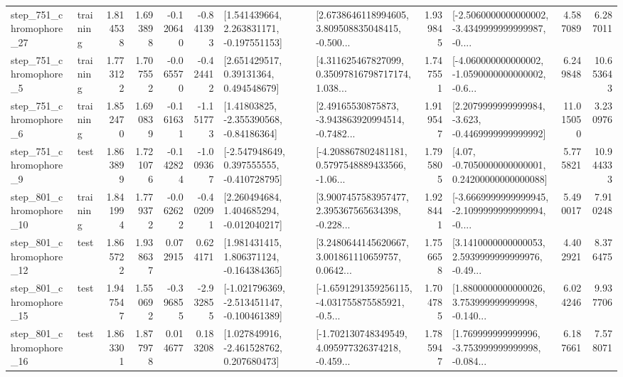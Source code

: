 \begin{tabular}{llrrrrllrlrr}
  step\_751\_chromophore\_27 &  training &      1.814538 &    1.693898 &     -0.120640 & -0.841393 &    [1.541439664, 2.263831171, -0.197551153] &  [2.6738646118994605, 3.809508835048415, -0.500... &       1.939845 &  [-2.5060000000000002, -3.4349999999999987, -0.... &            4.587089 &          6.287011 \\
   step\_751\_chromophore\_5 &  training &      1.773122 &    1.707552 &     -0.065570 & -0.424412 &      [2.651429517, 0.39131364, 0.494548679] &  [4.311625467827099, 0.35097816798717174, 1.038... &       1.747551 &  [-4.060000000000002, -1.0590000000000002, -0.6... &            6.249848 &         10.653643 \\
   step\_751\_chromophore\_6 &  training &      1.852470 &    1.690839 &     -0.161631 & -1.151773 &     [1.41803825, -2.355390568, -0.84186364] &  [2.49165530875873, -3.943863920994514, -0.7482... &       1.919547 &  [2.2079999999999984, -3.623, -0.4469999999999992] &           11.015050 &          3.230976 \\
   step\_751\_chromophore\_9 &      test &      1.863899 &    1.721076 &     -0.142824 & -1.009367 &   [-2.547948649, 0.397555555, -0.410728795] &  [-4.208867802481181, 0.5797548889433566, -1.06... &       1.795805 &   [4.07, -0.7050000000000001, 0.24200000000000088] &            5.775821 &         10.944333 \\
  step\_801\_chromophore\_10 &  training &      1.841994 &    1.779372 &     -0.062622 & -0.402091 &    [2.260494684, 1.404685294, -0.012040217] &  [3.9007457583957477, 2.395367565634398, -0.228... &       1.928441 &  [-3.6669999999999945, -2.1099999999999994, -0.... &            5.490017 &          7.910248 \\
  step\_801\_chromophore\_12 &      test &      1.865722 &    1.938637 &      0.072915 &  0.624171 &    [1.981431415, 1.806371124, -0.164384365] &  [3.2480644145620667, 3.001861110659757, 0.0642... &       1.756658 &  [3.1410000000000053, 2.5939999999999976, -0.49... &            4.402921 &          8.376475 \\
  step\_801\_chromophore\_15 &      test &      1.947547 &    1.550692 &     -0.396855 & -2.932855 &  [-1.021796369, -2.513451147, -0.100461389] &  [-1.6591291359256115, -4.031755875585921, -0.5... &       1.704785 &  [1.8800000000000026, 3.753999999999998, -0.140... &            6.024246 &          9.937706 \\
  step\_801\_chromophore\_16 &      test &      1.863301 &    1.877978 &      0.014677 &  0.183208 &    [1.027849916, -2.461528762, 0.207680473] &  [-1.702130748349549, 4.095977326374218, -0.459... &       1.785947 &  [1.769999999999996, -3.753999999999998, -0.084... &            6.187661 &          7.578071 \\

\end{tabular}
